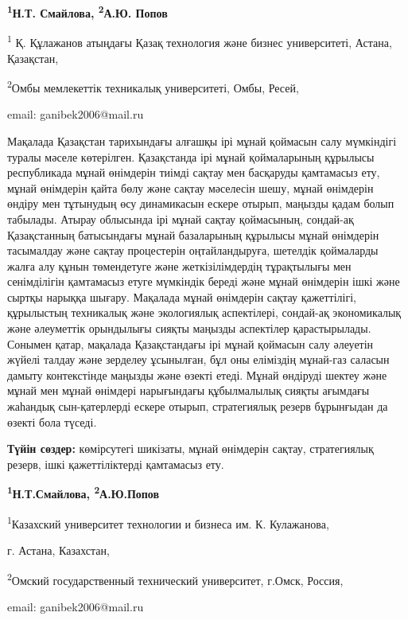 \begin{center}
{\bfseries \textsuperscript{1}Н.Т. Смайлова\envelope, \textsuperscript{2}А.Ю. Попов}

\textsuperscript{1} Қ. Құлажанов атыңдағы Қазақ технология және бизнес
университеті, Астана, Қазақстан,

\textsuperscript{2}Омбы мемлекеттік техникалық университеті, Омбы,
Ресей,

email: ganibek2006@mail.ru
\end{center}

Мақалада Қазақстан тарихындағы алғашқы ірі мұнай қоймасын салу
мүмкіндігі туралы мәселе көтерілген. Қазақстанда ірі мұнай қоймаларының
құрылысы республикада мұнай өнімдерін тиімді сақтау мен басқаруды
қамтамасыз ету, мұнай өнімдерін қайта бөлу және сақтау мәселесін шешу,
мұнай өнімдерін өндіру мен тұтынудың өсу динамикасын ескере отырып,
маңызды қадам болып табылады. Атырау облысында ірі мұнай сақтау
қоймасының, сондай-ақ Қазақстанның батысындағы мұнай базаларының
құрылысы мұнай өнімдерін тасымалдау және сақтау процестерін
оңтайландыруға, шетелдік қоймаларды жалға алу құнын төмендетуге және
жеткізілімдердің тұрақтылығы мен сенімділігін қамтамасыз етуге мүмкіндік
береді және мұнай өнімдерін ішкі және сыртқы нарыққа шығару. Мақалада
мұнай өнімдерін сақтау қажеттілігі, құрылыстың техникалық және
экологиялық аспектілері, сондай-ақ экономикалық және әлеуметтік
орындылығы сияқты маңызды аспектілер қарастырылады. Сонымен қатар,
мақалада Қазақстандағы ірі мұнай қоймасын салу әлеуетін жүйелі талдау
және зерделеу ұсынылған, бұл оны еліміздің мұнай-газ саласын дамыту
контекстінде маңызды және өзекті етеді. Мұнай өндіруді шектеу және мұнай
мен мұнай өнімдері нарығындағы құбылмалылық сияқты ағымдағы жаһандық
сын-қатерлерді ескере отырып, стратегиялық резерв бұрынғыдан да өзекті
бола түседі.

{\bfseries Түйін сөздер:} көмірсутегі шикізаты, мұнай өнімдерін сақтау,
стратегиялық резерв, ішкі қажеттіліктерді қамтамасыз ету.


\begin{center}
{\bfseries \textsuperscript{1}Н.Т.Смайлова\envelope, \textsuperscript{2}А.Ю.Попов}

\textsuperscript{1}Казахский университет технологии и бизнеса им. К.
Кулажанова,

г. Астана, Казахстан,

\textsuperscript{2}Омский государственный технический университет,
г.Омск, Россия,

email: ganibek2006@mail.ru
\end{center}

